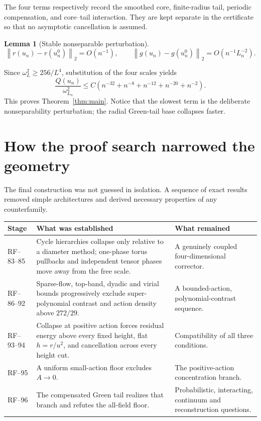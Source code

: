 \documentclass[11pt]{article}
\newtheorem{lemma}[theorem]{Lemma}
\theoremstyle{remark}
\newcommand{\norm}[1]{\left\lVert#1\right\rVert}
\begin{document}
The four terms respectively record the smoothed core, finite-radius tail,
periodic compensation, and core--tail interaction.  They are kept separate
in the certificate so that no asymptotic cancellation is assumed.

\begin{lemma}[Stable nonseparable perturbation]
\[
 \norm{r(u_n)-r(u_n^0)}_2=O(n^{-1}),\qquad
 \norm{g(u_n)-g(u_n^0)}_2=O(n^{-1}L_n^{-2}).
\]
\end{lemma}

Since \(\omega_L^2\geq256/L^4\), substitution of the four scales yields
\[
 \frac{Q(u_n)}{\omega_{L_n}^2}
 \leq C(n^{-32}+n^{-8}+n^{-12}+n^{-20}+n^{-2}).
\]
This proves Theorem~\ref{thm:main}.  Notice that the slowest term is the
deliberate nonseparability perturbation; the radial Green-tail base collapses
faster.

\section{How the proof search narrowed the geometry}

The final construction was not guessed in isolation.  A sequence of exact
results removed simple architectures and derived necessary properties of
any counterfamily.

\begin{center}
\begin{tabularx}{\textwidth}{@{}p{}YY@{}}
\toprule
Stage & What was established & What remained \\
\midrule
RF--83--85 & Cycle hierarchies collapse only relative to a diameter method;
one-phase torus pullbacks and independent tensor phases move away from the
free scale. & A genuinely coupled four-dimensional corrector. \\
RF--86--92 & Sparse-flow, top-band, dyadic and virial bounds progressively
exclude super-polynomial contrast and action density above \(272/29\). & A
bounded-action, polynomial-contrast sequence. \\
RF--93--94 & Collapse at positive action forces residual energy above every
fixed height, flat \(h=r/u^2\), and cancellation across every height cut. &
Compatibility of all three conditions. \\
RF--95 & A uniform small-action floor excludes \(A\to0\). & The
positive-action concentration branch. \\
RF--96 & The compensated Green tail realizes that branch and refutes the
all-field floor. & Probabilistic, interacting, continuum and reconstruction
questions. \\
\bottomrule
\end{tabularx}
\end{center}
\end{document}
